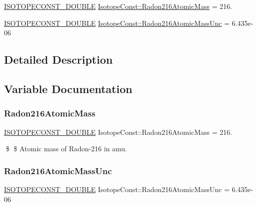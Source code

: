 \begin{DoxyCompactItemize}
\item 
\mbox{\hyperlink{group___isotope_const-_macros_ga8f45a7272ce02c0b4c65c44636ed719a}{I\+S\+O\+T\+O\+P\+E\+C\+O\+N\+S\+T\+\_\+\+D\+O\+U\+B\+LE}} \mbox{\hyperlink{group___isotope_const-_radon-_rn216_ga3da96e7674ef6fb21973500192447495}{Isotope\+Const\+::\+Radon216\+Atomic\+Mass}} = 216.
\item 
\mbox{\hyperlink{group___isotope_const-_macros_ga8f45a7272ce02c0b4c65c44636ed719a}{I\+S\+O\+T\+O\+P\+E\+C\+O\+N\+S\+T\+\_\+\+D\+O\+U\+B\+LE}} \mbox{\hyperlink{group___isotope_const-_radon-_rn216_ga9a2fd3d833f49495422bafa107d5dd65}{Isotope\+Const\+::\+Radon216\+Atomic\+Mass\+Unc}} = 6.\+435e-\/06
\end{DoxyCompactItemize}


\subsection{Detailed Description}


\subsection{Variable Documentation}
\mbox{\label{group___isotope_const-_radon-_rn216_ga3da96e7674ef6fb21973500192447495}} 
\subsubsection{\texorpdfstring{Radon216\+Atomic\+Mass}{Radon216AtomicMass}}
{\footnotesize\ttfamily \mbox{\hyperlink{group___isotope_const-_macros_ga8f45a7272ce02c0b4c65c44636ed719a}{I\+S\+O\+T\+O\+P\+E\+C\+O\+N\+S\+T\+\_\+\+D\+O\+U\+B\+LE}} Isotope\+Const\+::\+Radon216\+Atomic\+Mass = 216.}

\$ \$ Atomic mass of Radon-\/216 in amu. \mbox{\label{group___isotope_const-_radon-_rn216_ga9a2fd3d833f49495422bafa107d5dd65}} 
\subsubsection{\texorpdfstring{Radon216\+Atomic\+Mass\+Unc}{Radon216AtomicMassUnc}}
{\footnotesize\ttfamily \mbox{\hyperlink{group___isotope_const-_macros_ga8f45a7272ce02c0b4c65c44636ed719a}{I\+S\+O\+T\+O\+P\+E\+C\+O\+N\+S\+T\+\_\+\+D\+O\+U\+B\+LE}} Isotope\+Const\+::\+Radon216\+Atomic\+Mass\+Unc = 6.\+435e-\/06}

